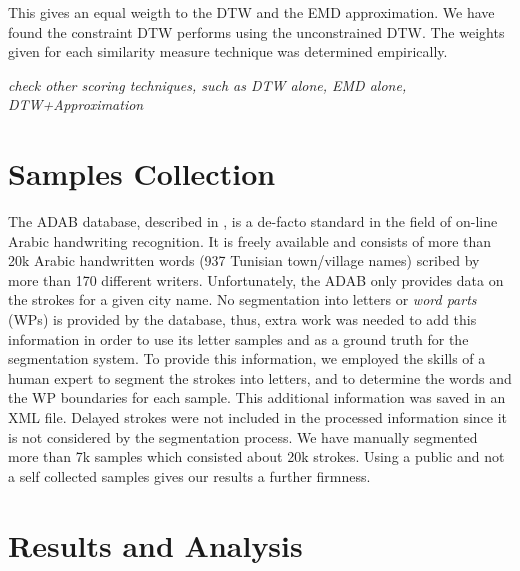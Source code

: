 \documentclass[10pt, conference, compsocconf]{IEEEtran}
\theoremstyle{definition}
\begin{document}
This gives an equal weigth to the DTW and the EMD approximation.
We have found the constraint DTW performs using the unconstrained DTW.
The weights given for each similarity measure technique was determined empirically.

\emph{check other scoring techniques, such as DTW alone, EMD alone, DTW+Approximation}

\section{Samples Collection}
\label{sec:Samples_collection}
The ADAB database, described in \cite{el2009icdar}, is a de-facto standard in the field of on-line Arabic handwriting recognition. 
It is freely available and consists of more than 20k Arabic handwritten words (937 Tunisian town/village names) scribed by more than 170 different writers. 
Unfortunately, the ADAB only provides data on the strokes for a given city name. 
No segmentation into letters or \emph{word parts} (WPs) is provided by the database, thus, extra work was needed to add this information in order to use its letter samples and as a ground truth for the segmentation system.
To provide this information, we employed the skills of a human expert to segment the strokes into letters, and to determine the words and the WP boundaries for each sample. 
This additional information was saved in an XML file. 
Delayed strokes were not included in the processed information since it is not considered by the segmentation process.
We have manually segmented more than 7k samples which consisted about 20k strokes.
Using a public and not a self collected samples gives our results a further firmness.

\section{Results and Analysis}
\label{sec:results_analysis}

\end{document}
